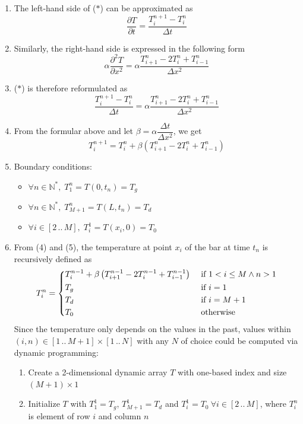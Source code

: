 \documentclass[a4paper,12pt]{article}
\begin{document}
\begin{enumerate}
  \item The left-hand side of ($*$) can be approximated as
    \[\frac{\partial T}{\partial t} = \frac{T_i^{n+1} - T_i^n}{\Delta t}\]
  \item Similarly, the right-hand side is expressed in the following form
    \[\alpha\frac{\partial^2 T}{\partial x^2}
      = \alpha\frac{T_{i+1}^n - 2T_i^n + T_{i-1}^n}{\Delta x^2}\]
  \item ($*$) is therefore reformulated as
    \[\frac{T_i^{n+1} - T_i^n}{\Delta t}
      = \alpha\frac{T_{i+1}^n - 2T_i^n + T_{i-1}^n}{\Delta x^2}\]
  \item From the formular above
    and let $\beta = \alpha\dfrac{\Delta t}{\Delta x^2}$,
    we get
    \[T_i^{n+1} = T_i^n + \beta\left(T_{i+1}^n - 2T_i^n + T_{i-1}^n\right)\]
  \item Boundary conditions:
    \begin{itemize}
      \item $\forall n \in \mathbb N^*,\; T_1^n = T(0, t_n) = T_g$
      \item $\forall n \in \mathbb N^*,\; T_{M+1}^n = T(L, t_n) = T_d$
      \item $\forall i \in [2\,..\,M],\; T_{i}^1 = T(x_i, 0) = T_0$
    \end{itemize}
  \item From (4) and (5), the temperature at point $x_i$ of the bar
    at time $t_n$ is recursively defined as
    \[T_i^n = \begin{dcases}
        T_i^{n-1} + \beta\left(T_{i+1}^{n-1} - 2T_i^{n-1} + T_{i-1}^{n-1}\right)
        &\text{ if }1 < i \le M \land n > 1\\
        T_g &\text{ if }i = 1\\
        T_d &\text{ if }i = M + 1\\
        T_0 &\text{ otherwise}
      \end{dcases}\]
    Since the temperature only depends on the values in the past, values within
    $(i, n) \in [1\,..\,M+1]\times[1\,..\,N]$ with any $N$ of choice could
    be computed via dynamic programming:
    \begin{enumerate}
      \item Create a 2-dimensional dynamic array $T$ with one-based index
        and size $(M+1)\times 1$
      \item Initialize $T$ with $T_1^1 = T_g$, $T_{M+1}^1 = T_d$
        and $T_i^1 = T_0\ \forall i \in [2\,..\,M]$,
        where $T_i^n$ is element of row $i$ and column $n$

\end{enumerate}
\end{enumerate}
\end{document}
